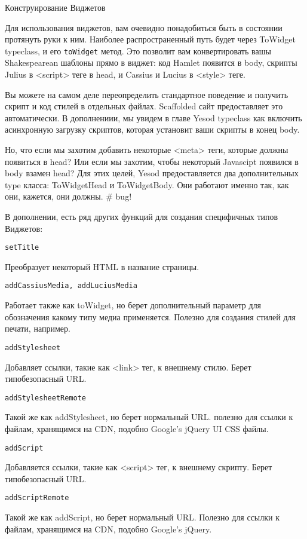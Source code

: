 Конструирование Виджетов

Для использования виджетов, вам очевидно понадобиться быть в состоянии протянуть руки к ним. Наиболее распространенный путь будет через ToWidget typeclass, и его \lstinline'toWidget' метод. Это позволит вам конвертировать вашы Shakespearean шаблоны прямо в виджет: код Hamlet появится в body, скрипты Julius в <script> теге в head, и Cassius и Lucius в <style> теге.

Вы можете на самом деле переопределить стандартное поведение и получить скрипт и код стилей в отдельных файлах. Scaffolded сайт предоставляет это автоматически. В дополнениии, мы увидем в главе Yesod typeclass как включить асинхронную загрузку скриптов, которая установит ваши скрипты в конец body.

Но, что если мы захотим добавить некоторые <meta> теги, которые должны появиться в head? Или если мы захотим, чтобы некоторый Javascipt появился в body взамен head? Для этих целей, Yesod предоставляется два дополнительных type класса: ToWidgetHead и ToWidgetBody. Они работают именно так, как они, кажется, они должны. # bug!

В дополнении, есть ряд других функций для создания специфичных типов Виджетов:

\lstinline'setTitle'

Преобразует некоторый HTML в название страницы.

\lstinline'addCassiusMedia, addLuciusMedia'

Работает также как toWidget, но берет дополнительный параметр для обозначения какому типу медиа применяется. Полезно для создания стилей для печати, например.

\lstinline'addStylesheet'

Добавляет ссылки, такие как <link> тег, к внешнему стилю. Берет типобезопасный URL.

\lstinline'addStylesheetRemote'

Такой же как addStylesheet, но берет нормальный URL. полезно для ссылки к файлам, хранящимся на CDN, подобно Google's jQuery UI CSS файлы.

\lstinline'addScript'

Добавляется ссылки, такие как <script> тег, к внешнему скрипту. Берет типобезопасный URL. 

\lstinline'addScriptRemote'

Такой же как addScript, но берет нормальный URL. Полезно для ссылки к файлам, хранящимся на CDN, подобно Google's jQuery.

